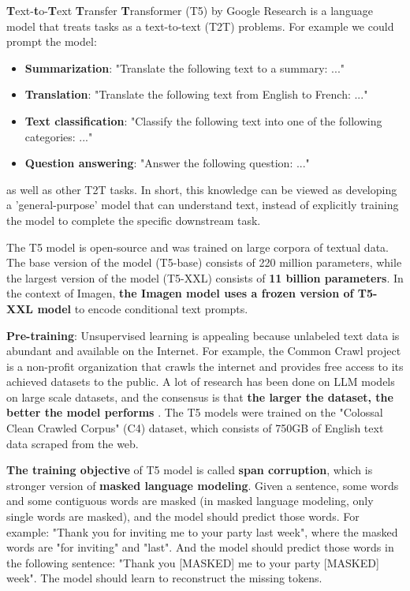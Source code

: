 \textbf{T}ext-\textbf{t}o-\textbf{T}ext \textbf{T}ransfer \textbf{T}ransformer (T5) \cite{t5_model} by Google Research is a language model that treats tasks as a text-to-text (T2T) problems. For example we could prompt the model:

\begin{itemize}
    \item \textbf{Summarization}: "Translate the following text to a summary: ..."
    \item \textbf{Translation}: "Translate the following text from English to French: ..."
    \item \textbf{Text classification}: "Classify the following text into one of the following categories: ..."
    \item \textbf{Question answering}: "Answer the following question: ..."
\end{itemize}

as well as other T2T tasks. In short, this knowledge can be viewed as developing a 'general-purpose' model that can understand text, instead of explicitly training the model to complete the specific downstream task.

The T5 model is open-source and was trained on large corpora of textual data. The base version of the model (T5-base) consists of 220 million parameters, while the largest version of the model (T5-XXL) consists of \textbf{11 billion parameters}. In the context of Imagen, \textbf{the Imagen model uses a frozen version of T5-XXL model} to encode conditional text prompts.

\textbf{Pre-training}: Unsupervised learning is appealing because unlabeled text data is abundant and available on the Internet. For example, the Common Crawl project \cite{common_crawl_project} is a non-profit organization that crawls the internet and provides free access to its achieved datasets to the public. A lot of research has been done on LLM models on large scale datasets, and the consensus is that \textbf{the larger the dataset, the better the model performs} \cite{radford2019language} \cite{jozefowicz2016exploring} \cite{hestness2017deep}. The T5 models were trained on the "Colossal Clean Crawled Corpus" (C4) dataset, which consists of 750GB of English text data scraped from the web.

\textbf{The training objective} of T5 model is called \textbf{span corruption}, which is stronger version of \textbf{masked language modeling}. Given a sentence, some words and some contiguous words are masked (in masked language modeling, only single words are masked), and the model should predict those words. For example: "Thank you for inviting me to your party last week", where the masked words are "for inviting" and "last". And the model should predict those words in the following sentence: "Thank you [MASKED] me to your party [MASKED] week". The model should learn to reconstruct the missing tokens.

